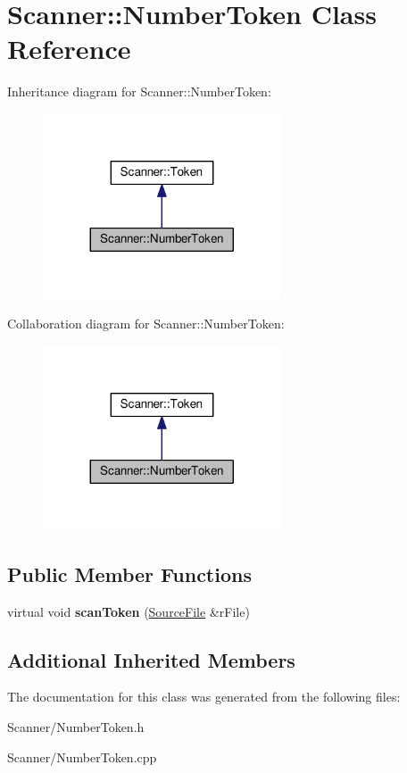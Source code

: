 \hypertarget{class_scanner_1_1_number_token}{}\section{Scanner\+:\+:Number\+Token Class Reference}
\label{class_scanner_1_1_number_token}


Inheritance diagram for Scanner\+:\+:Number\+Token\+:
\nopagebreak
\begin{figure}[H]
\begin{center}
\leavevmode
\includegraphics[width=200pt]{class_scanner_1_1_number_token__inherit__graph}
\end{center}
\end{figure}


Collaboration diagram for Scanner\+:\+:Number\+Token\+:
\nopagebreak
\begin{figure}[H]
\begin{center}
\leavevmode
\includegraphics[width=200pt]{class_scanner_1_1_number_token__coll__graph}
\end{center}
\end{figure}
\subsection*{Public Member Functions}
\begin{DoxyCompactItemize}
\item 
virtual void {\bfseries scan\+Token} (\hyperlink{class_scanner_1_1_source_file}{Source\+File} \&r\+File)\hypertarget{class_scanner_1_1_number_token_a9e1815b574446510a45a669e6cc7c750}{}\label{class_scanner_1_1_number_token_a9e1815b574446510a45a669e6cc7c750}

\end{DoxyCompactItemize}
\subsection*{Additional Inherited Members}


The documentation for this class was generated from the following files\+:\begin{DoxyCompactItemize}
\item 
Scanner/Number\+Token.\+h\item 
Scanner/Number\+Token.\+cpp\end{DoxyCompactItemize}
